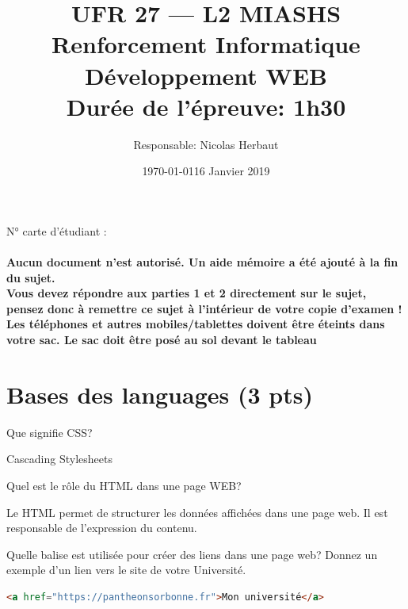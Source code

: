 \documentclass[a4paper,11pt]{exam}
\date{\today}
\title{UFR 27 --- L2 MIASHS Renforcement Informatique \\ {Développement WEB} \\  \normalsize{Durée de l'épreuve: 1h30} }
\author{Responsable: Nicolas Herbaut}
\date{16 Janvier 2019}
\begin{document}
\maketitle

\noindent N° carte d'étudiant :  \fillin \\ \\


\noindent \textbf{Aucun document n'est autorisé. Un aide mémoire a été ajouté à la fin du sujet.\\
\noindent Vous devez répondre aux parties 1 et 2 directement sur le sujet, pensez donc à remettre ce sujet à l'intérieur de votre copie d'examen !\\
\noindent Les téléphones et autres mobiles/tablettes doivent être éteints dans votre sac. Le sac doit être posé au sol devant le tableau
}








\section{Bases des languages (3 pts)}

\begin{questions}

	\question[1] Que signifie CSS?
	\begin{solutionorlines}[3cm]
		Cascading Stylesheets
	\end{solutionorlines}

	\question[1] Quel est le rôle du HTML dans une page WEB?
	\begin{solutionorlines}[3cm]
		Le HTML permet de structurer les données affichées dans une page web. Il est responsable de l'expression du contenu.
		
	\end{solutionorlines}

	\question[1] Quelle balise est utilisée pour créer des liens dans une page web? Donnez un exemple d'un lien vers le site de votre Université.
	\begin{solutionorlines}[3cm]
		\begin{lstlisting}[frame=leftline,language={HTML},numbers=none]  
<a href="https://pantheonsorbonne.fr">Mon université</a>
		\end{lstlisting}
	\end{solutionorlines}

\end{questions}
\end{document}
